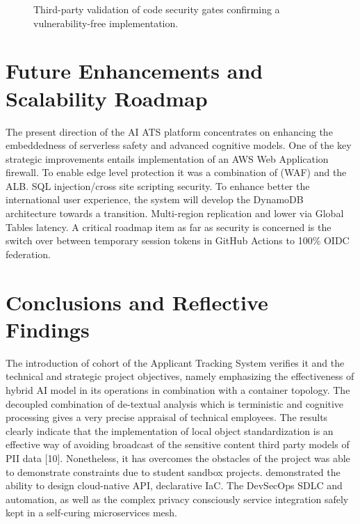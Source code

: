 \documentclass[conference]{IEEEtran}
\begin{document}
\begin{figure}[ht!]
\centering
{}
\caption{Third-party validation of code security gates confirming a vulnerability-free implementation.}
\label{fig:security}
\end{figure}

\section{Future Enhancements and Scalability Roadmap}
The present direction of the AI ATS platform concentrates on enhancing the embeddedness of serverless safety and advanced cognitive models. One of the key strategic improvements entails implementation of an AWS Web Application firewall. To enable edge level protection it was a combination of (WAF) and the ALB. SQL injection/cross site scripting security. To enhance better the international user experience, the system will develop the DynamoDB architecture towards a transition. Multi-region replication and lower via Global Tables latency. A critical roadmap item as far as security is concerned is the switch over between temporary session tokens in GitHub Actions to 100\% OIDC federation.

\section{Conclusions and Reflective Findings}
The introduction of cohort of the Applicant Tracking System verifies it and the technical and strategic project objectives, namely emphasizing the effectiveness of hybrid AI model in its operations in combination with a container topology. The decoupled combination of de-textual analysis which is terministic and cognitive processing gives a very precise appraisal of technical employees. The results clearly indicate that the implementation of local object standardization is an effective way of avoiding broadcast of the sensitive content third party models of PII data [10]. Nonetheless, it has overcomes the obstacles of the project was able to demonstrate constraints due to student sandbox projects. demonstrated the ability to design cloud-native API, declarative IaC. The DevSecOps SDLC and automation, as well as the complex privacy consciously service integration safely kept in a self-curing microservices mesh.
\end{document}
